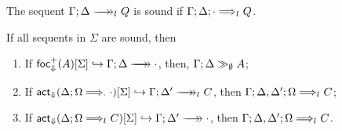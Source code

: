 \begin{definition}
  The sequent $\zfneuseq{\Gamma}{\Delta}{\reactlist{}}{Q}$ is sound if
  $\Gamma; \Delta; \cdot \Longrightarrow_{l_{}} Q$.
\end{definition}

\begin{lemma}\label{fsoundnesslemma}
  If all sequents in $\Sigma$ are sound, then

  \begin{enumerate}
  \item If $\relj{\frfrel{A}}{\Sigma}{\zfneuseqempty{\Gamma}{\Delta}}$,
    then, $\Gamma; \Delta \gg_{\emptyset} A$;
  \item If
    $\relj{\factrel{\zsyseq{\Delta}{\Omega}{\cdot}{\cdot}}}{\Sigma}
    {\zfneuseq{\Gamma}{\Delta'}{\reactlist{}}{C}}$, then
    $\Gamma; \Delta, \Delta'; \Omega \Longrightarrow_{l_{}} C$;
  \item If
    $\relj{\factrel{\zsyseq{\Delta}{\Omega}{\reactlist{}}{C}}}{\Sigma}
    {\zfneuseqempty{\Gamma}{\Delta'}}$, then
    $\Gamma; \Delta, \Delta'; \Omega \Longrightarrow_{l_{}} C$.
  \end{enumerate}
\end{lemma}
